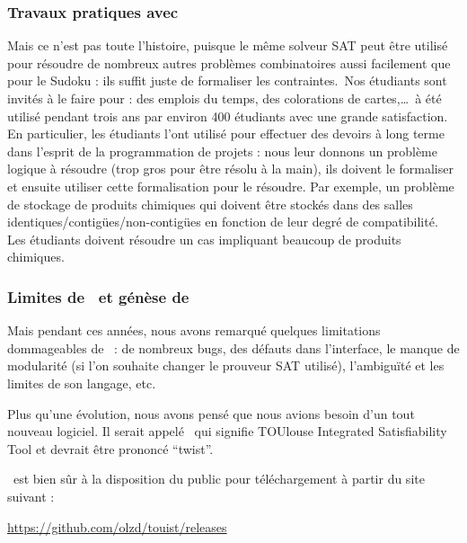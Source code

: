 \subsubsection*{Travaux pratiques avec \satoulouse}
Mais ce n'est pas toute l'histoire, puisque le m\^eme solveur SAT peut \^etre utilis\'e pour r\'esoudre de nombreux autres probl\`emes combinatoires aussi facilement que pour le Sudoku : ils suffit juste de formaliser les contraintes.\ Nos \'etudiants sont invit\'es \`a le faire pour : des emplois du temps, des colorations de cartes,\ldots \satoulouse\ \`a \'et\'e utilis\'e pendant trois ans par environ 400 \'etudiants avec une grande satisfaction. En particulier, les \'etudiants l'ont utilis\'e pour effectuer des devoirs \`a long terme dans l'esprit de la programmation de projets : nous leur donnons un probl\`eme logique \`a r\'esoudre (trop gros pour \^etre r\'esolu \`a la main), ils doivent le formaliser et ensuite utiliser cette formalisation pour le r\'esoudre. Par exemple, un probl\`eme de stockage de produits chimiques qui doivent \^etre stock\'es dans des salles identiques/contig\"ues/non-contig\"ues en fonction de leur degr\'e de compatibilit\'e. Les \'etudiants doivent r\'esoudre un cas impliquant beaucoup de produits chimiques.


\subsubsection*{Limites de \satoulouse\ et g\'en\`ese de \nameTool}
Mais pendant ces ann\'ees, nous avons remarqu\'e quelques limitations dommageables de \satoulouse\ : de nombreux bugs, des d\'efauts dans l'interface, le manque de modularit\'e (si l'on souhaite changer le prouveur SAT utilis\'e), l'ambigu\"it\'e et les limites de son langage, etc.

Plus qu'une \'evolution, nous avons pens\'e que nous avions besoin d'un tout nouveau logiciel. Il serait appel\'e \nameTool\ qui signifie TOUlouse Integrated Satisfiability Tool et devrait \^etre prononc\'e ``twist''. 

\nameTool\ est bien s\^ur \`a la disposition du public pour t\'el\'echargement \`a partir du site suivant :
\begin{center}\url{ https://github.com/olzd/touist/releases }\end{center}



